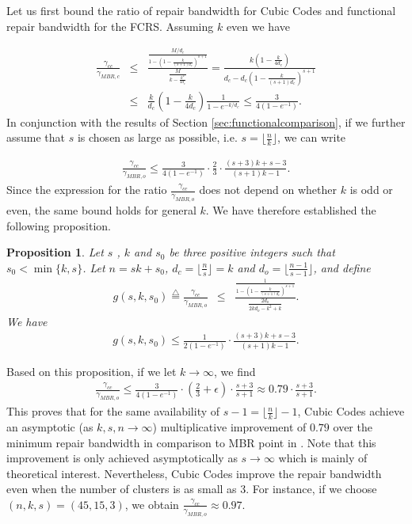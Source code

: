 \documentclass[journal,onecolumn,draftcls]{IEEEtran}
\newtheorem{proposition}{Proposition}
\begin{document}
Let us first bound the ratio of repair bandwidth for Cubic Codes and functional repair bandwidth for the FCRS. Assuming $k$ even we have

\begin{eqnarray*}
\frac{\gamma_{cc}}{\gamma_{MBR,c}} & \le &\frac{\frac{{M}/d_c}{1-(1 -\frac{k}{(s+1)d_c})^{s+1}}
}{\frac{{M}}{k - \frac{k^2}{4d_c}}}  = \frac{k(1 - \frac{k}{4d_c})}{d_c - d_c(1- \frac{k}{(s+1)d_c})^{s+1}}\\&\le& \frac{k}{d_c}(1-\frac{k}{4d_c})\frac{1}{1-e^{-k/d_c}}\le\frac{3}{4(1-e^{-1})} .
 \end{eqnarray*}
In conjunction with the results of Section \ref{sec:functionalcomparison},  if we further assume that $s$ is chosen as large as possible, i.e. $s = \lfloor\frac{n}{k}\rfloor$, we can write

  \begin{eqnarray*}
\frac{\gamma_{cc}}{\gamma_{MBR,o}}\le \frac{3}{4(1-e^{-1})} \cdot   \frac{2}{3}\cdot \frac{(s+3)k + s -3}{(s+1)k -1}.
 \end{eqnarray*}
Since the expression for the ratio $\frac{\gamma_{cc}}{\gamma_{MBR,o}}$ does not depend on whether $k$ is odd or even, the same bound holds for general $k$.  We have therefore established the following proposition.
\begin{proposition}
Let $s$ , $k$ and $s_0$ be three positive integers such that $s_0<\min\{k,s\}$. Let $n = sk + s_0$, $d_c = \lfloor\frac{n}{s}\rfloor = k$ and $d_o = \lfloor\frac{n-1}{s-1}\rfloor$, and define 
\begin{eqnarray*}
g(s,k,s_0)\stackrel{\triangle}{=} \frac{\gamma_{cc}}{\gamma_{MBR,o}} & \le &\frac{\frac{1}{1-(1 -\frac{k}{(s+1)d_c})^{s+1}}
}{\frac{2d_o}{2kd_o - k^2 + k}}.
 \end{eqnarray*}
 We have
\begin{eqnarray*}
g(s,k,s_0)\le \frac{1}{2(1-e^{-1})}\cdot \frac{(s+3)k + s -3}{(s+1)k -1}.
\end{eqnarray*}
\end{proposition}
Based on this proposition, if we let $k\rightarrow\infty$, we find
  \begin{eqnarray*}
\frac{\gamma_{cc}}{\gamma_{MBR,o}}\le \frac{3}{4(1-e^{-1})} \cdot (\frac{2}{3}+\epsilon)\cdot \frac{s +3 }{s + 1} \approx 0.79 \cdot \frac{s +3 }{s + 1}.
  \end{eqnarray*}
This proves that for the same availability of $s -1 = \lfloor\frac{n}{k}\rfloor -1$, Cubic Codes achieve an asymptotic (as $k,s,n \rightarrow \infty$) multiplicative improvement of $0.79$ over the minimum repair bandwidth in comparison to MBR point in \cite{dimakis2010network}. Note that this improvement is only achieved asymptotically as $s\rightarrow \infty$ which is mainly of theoretical interest. Nevertheless, Cubic Codes improve the repair bandwidth even when the number of clusters is as small as 3. For instance, if we choose $(n,k,s) = (45, 15, 3)$, we obtain $\frac{\gamma_{cc}}{\gamma_{MBR,o}}\approx 0.97$.   
\end{document}
